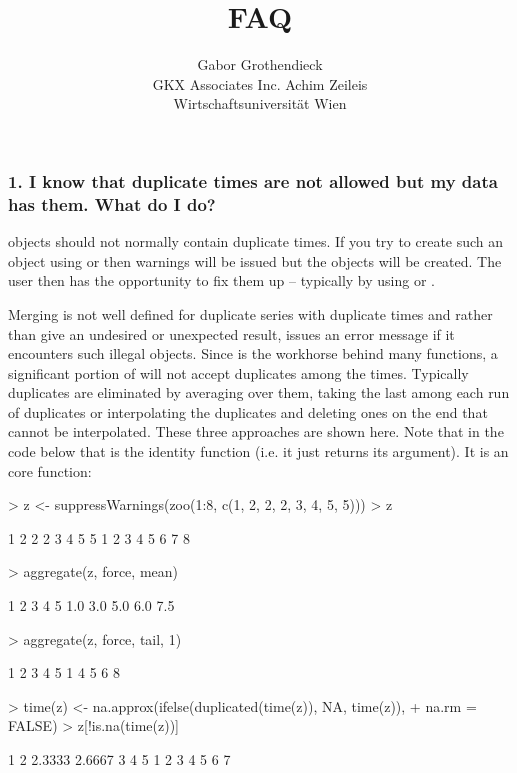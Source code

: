 \documentclass{Z}
\author{Gabor Grothendieck\\GKX Associates Inc. \And
        Achim Zeileis\\Wirtschaftsuniversit\"at Wien}
\title{\pkg{zoo} FAQ}
\newcommand{\mysection}[1]{\subsubsection[#1]{\textbf{#1}}}
\begin{document}



\mysection{1. I know that duplicate times are not allowed but my data has them.  What do I do?}

 objects should not normally contain duplicate times.
If you try to create such an object using
 or  then warnings will be issued but
the objects will be created.   The user then has the opportunity
to fix them up -- typically by using 
or .  

Merging is not well defined for duplicate series with duplicate
times and rather than give an undesired or unexpected result,
 issues an error message if it encounters
such illegal objects.   Since 
is the workhorse behind many  functions, a significant
portion of  will not accept
duplicates among the times.  Typically duplicates are eliminated by
averaging over them, taking the last among each run of duplicates
or interpolating the duplicates and deleting ones on the end that
cannot be interpolated.  These three approaches are shown here. Note
that in the code below that  is the identity 
function (i.e. it just returns its argument).  It 
is an  core function:

\begin{Schunk}
\begin{Sinput}
> z <- suppressWarnings(zoo(1:8, c(1, 2, 2, 2, 3, 4, 5, 5)))
> z
\end{Sinput}
\begin{Soutput}
1 2 2 2 3 4 5 5 
1 2 3 4 5 6 7 8 
\end{Soutput}
\begin{Sinput}
> aggregate(z, force, mean)
\end{Sinput}
\begin{Soutput}
  1   2   3   4   5 
1.0 3.0 5.0 6.0 7.5 
\end{Soutput}
\begin{Sinput}
> aggregate(z, force, tail, 1)
\end{Sinput}
\begin{Soutput}
1 2 3 4 5 
1 4 5 6 8 
\end{Soutput}
\begin{Sinput}
> time(z) <- na.approx(ifelse(duplicated(time(z)), NA, time(z)), 
+     na.rm = FALSE)
> z[!is.na(time(z))]
\end{Sinput}
\begin{Soutput}
     1      2 2.3333 2.6667      3      4      5 
     1      2      3      4      5      6      7 
\end{Soutput}
\end{Schunk}
\end{document}
